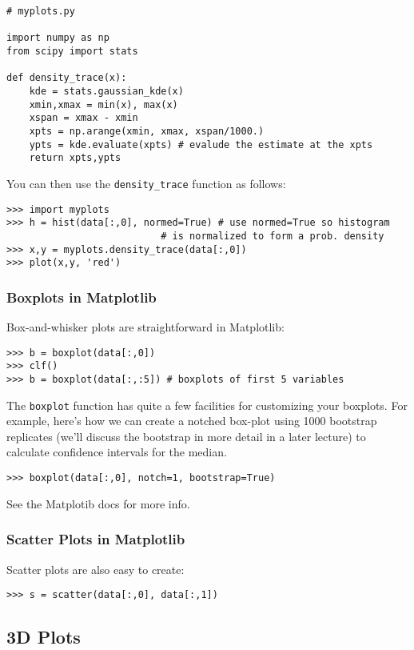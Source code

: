 \begin{lstlisting}
# myplots.py

import numpy as np
from scipy import stats

def density_trace(x):
    kde = stats.gaussian_kde(x)
    xmin,xmax = min(x), max(x)
    xspan = xmax - xmin
    xpts = np.arange(xmin, xmax, xspan/1000.)
    ypts = kde.evaluate(xpts) # evalude the estimate at the xpts
    return xpts,ypts
\end{lstlisting}
You can then use the \lstinline!density_trace! function as follows:

\begin{lstlisting}
>>> import myplots
>>> h = hist(data[:,0], normed=True) # use normed=True so histogram 
                           # is normalized to form a prob. density
>>> x,y = myplots.density_trace(data[:,0])
>>> plot(x,y, 'red')    
\end{lstlisting}
\subsubsection{Boxplots in Matplotlib}

Box-and-whisker plots are straightforward in Matplotlib:

\begin{lstlisting}
>>> b = boxplot(data[:,0])
>>> clf()
>>> b = boxplot(data[:,:5]) # boxplots of first 5 variables
\end{lstlisting}
The \lstinline!boxplot! function has quite a few facilities for
customizing your boxplots. For example, here's how we can create a
notched box-plot using 1000 bootstrap replicates (we'll discuss the
bootstrap in more detail in a later lecture) to calculate confidence
intervals for the median.

\begin{lstlisting}
>>> boxplot(data[:,0], notch=1, bootstrap=True)    
\end{lstlisting}
See the Matplotib docs for more info.

\subsubsection{Scatter Plots in Matplotlib}

Scatter plots are also easy to create:

\begin{lstlisting}
>>> s = scatter(data[:,0], data[:,1])    
\end{lstlisting}
\subsection{3D Plots}

